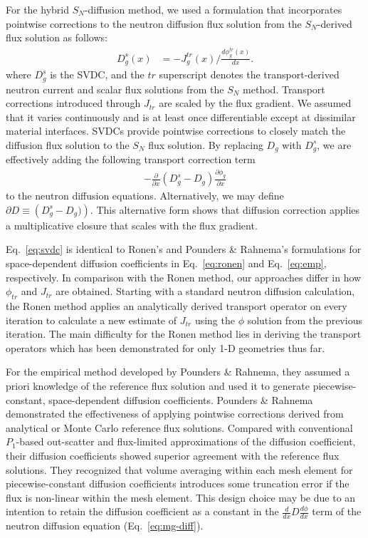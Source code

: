 For the hybrid $S_N$-diffusion method, we used a formulation that incorporates pointwise
corrections to the neutron diffusion flux solution from the $S_N$-derived flux solution as follows:
%
\begin{align}
  D^s_g(x) &= -J^{tr}_g(x)\bigg/\frac{d\phi^{tr}_g(x)}{dx}. \label{eq:svdc}
\end{align}
%
where $D^s_g$ is the \gls{SVDC}, and the $tr$ superscript denotes the transport-derived neutron
current and scalar flux solutions from the $S_N$ method. Transport corrections introduced through
$J_{tr}$ are scaled by the flux gradient. We assumed that it varies continuously and is
at least once differentiable except at dissimilar material interfaces. \glspl{SVDC} provide
pointwise corrections to closely match the diffusion flux solution to the $S_N$ flux solution.
By replacing $D_g$ with $D^s_g$, we are effectively adding the following transport correction term
%
\begin{gather}
  -\frac{\partial}{\partial x}(D^s_g-D_g)\frac{\partial\phi_g}{\partial x}
\end{gather}
to the neutron diffusion equations. Alternatively, we may define
$\partial D\equiv\left(D^s_g-D_g)\right)$. This alternative form shows that diffusion
correction applies a multiplicative closure that scales with the flux gradient.

Eq.\ \ref{eq:svdc} is identical to Ronen's \cite{ronen_accurate_2004} and Pounders \& Rahnema's
\cite{pounders_diffusion_2009} formulations for space-dependent diffusion coefficients in Eq.\
\ref{eq:ronen} and Eq.\ \ref{eq:emp}, respectively. In comparison with
the Ronen method, our approaches differ in how $\phi_{tr}$ and $J_{tr}$ are obtained. Starting with
a standard neutron diffusion calculation, the Ronen method applies an analytically derived
transport operator on every iteration to calculate a new estimate of $J_{tr}$ using the $\phi$
solution from the previous iteration. The main difficulty for the Ronen method lies in deriving the
transport operators which has been demonstrated for only 1-D geometries thus far.

For the empirical method developed by Pounders \& Rahnema, they assumed a priori knowledge of the
reference flux solution and used it to generate piecewise-constant, space-dependent diffusion
coefficients.
Pounders \& Rahnema \cite{pounders_diffusion_2009} demonstrated the effectiveness of applying
pointwise corrections derived from analytical or Monte Carlo reference flux solutions. Compared
with conventional $P_1$-based out-scatter and flux-limited approximations of the diffusion
coefficient, their diffusion coefficients showed superior agreement
with the reference flux solutions. They recognized that volume averaging within each mesh element
for piecewise-constant diffusion coefficients introduces some truncation error if the flux is
non-linear within the mesh element. This design choice may be due to an intention to retain the
diffusion coefficient as a constant in the $\frac{d}{dx}D\frac{d\phi}{dx}$ term of the neutron
diffusion equation (Eq.\ \ref{eq:mg-diff}).

